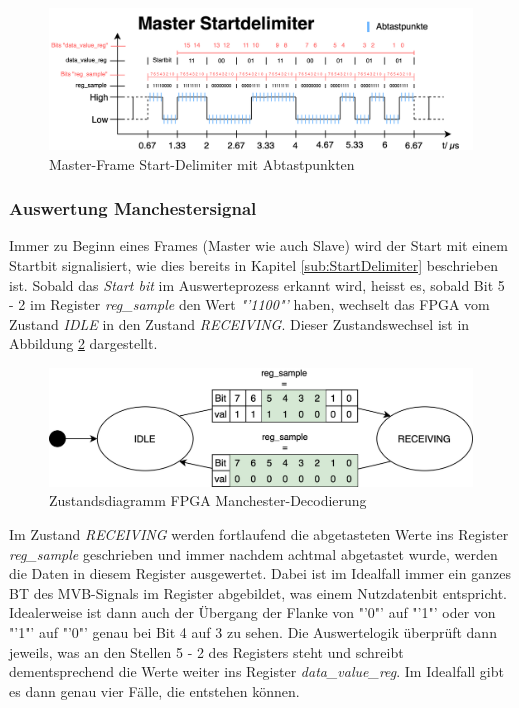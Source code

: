 \begin{figure}[H]
    \centering
    \includegraphics[width=1\linewidth]{Figures/Chap3/FPGA/Abtastpunkte_Master.png}
    \caption{Master-Frame Start-Delimiter mit Abtastpunkten}
    \label{fig:MasterframeAbtastung}
\end{figure}

\subsubsection{Auswertung Manchestersignal}
\label{Auswertung Manchestersignal}
Immer zu Beginn eines Frames (Master wie auch Slave) wird der Start mit einem Startbit signalisiert, wie dies bereits in Kapitel \ref{sub:StartDelimiter} beschrieben ist.
Sobald das \textit{Start bit} im Auswerteprozess erkannt wird, heisst es, sobald Bit 5 - 2 im Register \textit{reg\_sample} den Wert \textit{"'1100"'} haben, wechselt das FPGA vom Zustand \textit{IDLE} in den Zustand \textit{RECEIVING}. Dieser Zustandswechsel ist in Abbildung \ref{fig:FPGAIdleRec} dargestellt.

\begin{figure}[H]
    \centering
    \includegraphics[width=0.7\linewidth]{Figures//Chap3//FPGA/FPGA_idle_rec.png}
    \caption{Zustandsdiagramm FPGA Manchester-Decodierung}
    \label{fig:FPGAIdleRec}
\end{figure}

Im Zustand \textit{RECEIVING} werden fortlaufend die abgetasteten Werte ins Register 
\textit{reg\_sample} geschrieben und immer nachdem achtmal abgetastet wurde, werden die Daten in diesem Register ausgewertet. Dabei ist im Idealfall immer ein ganzes BT des MVB-Signals im Register abgebildet, was einem Nutzdatenbit entspricht. Idealerweise ist dann auch der Übergang der Flanke von "'0"' auf "'1"' oder von "'1"' auf "'0"' genau bei Bit 4 auf 3 zu sehen. Die Auswertelogik überprüft dann jeweils, was an den Stellen 5 - 2 des Registers steht und schreibt dementsprechend die Werte weiter ins Register \textit{data\_value\_reg}. Im Idealfall gibt es dann genau vier Fälle, die entstehen können.


